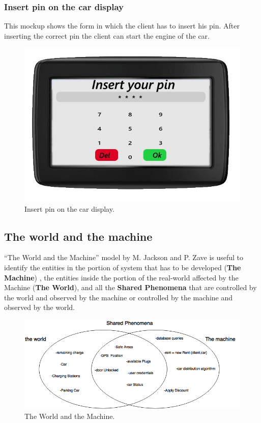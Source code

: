 \subsubsection{Insert pin on the car display} This mockup shows the form in which the client has to insert his pin. After inserting the correct pin the client can start the engine of the car.

\begin{figure}[ht]
\centering
\includegraphics[width=400 pt]{resources/nav68.jpg}
\caption{\label{fig:pin}Insert pin on the car display.}
\end{figure}

\subsection{The world and the machine}

“The World and the Machine” model by M. Jackson and P. Zave is useful to identify the entities in the portion of system that has to be developed (\textbf{The Machine}) , the entities inside the portion of the real-world affected by the Machine (\textbf{The World}), and all  the \textbf{Shared Phenomena} that are controlled by the world and observed by the machine  or controlled by the machine and observed by the world.

\begin{figure}[ht]
\centering
\includegraphics[width=400 pt]{resources/worldMachine.png}
\caption{\label{fig:WandM}The World and the Machine.}
\end{figure}
